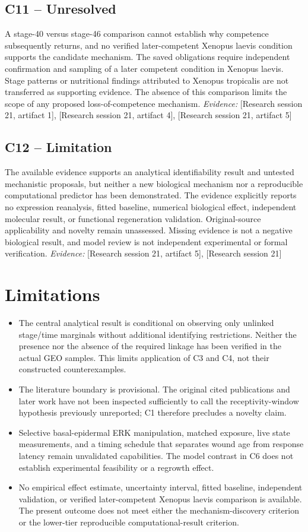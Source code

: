 \documentclass[11pt]{article}
\begin{document}
\subsection{C11 -- Unresolved}
A stage-40 versus stage-46 comparison cannot establish why competence subsequently returns, and no verified later-competent Xenopus laevis condition supports the candidate mechanism.
The saved obligations require independent confirmation and sampling of a later competent condition in Xenopus laevis. Stage patterns or nutritional findings attributed to Xenopus tropicalis are not transferred as supporting evidence. The absence of this comparison limits the scope of any proposed loss-of-competence mechanism.
\textit{Evidence: }[Research session 21, artifact 1], [Research session 21, artifact 4], [Research session 21, artifact 5]
\subsection{C12 -- Limitation}
The available evidence supports an analytical identifiability result and untested mechanistic proposals, but neither a new biological mechanism nor a reproducible computational predictor has been demonstrated.
The evidence explicitly reports no expression reanalysis, fitted baseline, numerical biological effect, independent molecular result, or functional regeneration validation. Original-source applicability and novelty remain unassessed. Missing evidence is not a negative biological result, and model review is not independent experimental or formal verification.
\textit{Evidence: }[Research session 21, artifact 5], [Research session 21]
\section{Limitations}
\begin{itemize}
\item The central analytical result is conditional on observing only unlinked stage/time marginals without additional identifying restrictions. Neither the presence nor the absence of the required linkage has been verified in the actual GEO samples. This limits application of C3 and C4, not their constructed counterexamples.
\item The literature boundary is provisional. The original cited publications and later work have not been inspected sufficiently to call the receptivity-window hypothesis previously unreported; C1 therefore precludes a novelty claim.
\item Selective basal-epidermal ERK manipulation, matched exposure, live state measurements, and a timing schedule that separates wound age from response latency remain unvalidated capabilities. The model contrast in C6 does not establish experimental feasibility or a regrowth effect.
\item No empirical effect estimate, uncertainty interval, fitted baseline, independent validation, or verified later-competent Xenopus laevis comparison is available. The present outcome does not meet either the mechanism-discovery criterion or the lower-tier reproducible computational-result criterion.
\end{itemize}
\end{document}
